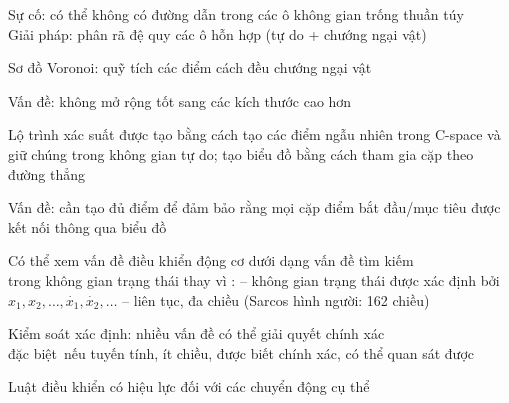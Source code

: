\documentclass{article}
\begin{document}
\begin{huge}

\qquad

\centerline{  \qquad {} }

Sự cố: có thể không có đường dẫn trong các ô không gian trống thuần túy\\
Giải pháp: phân rã đệ quy các ô hỗn hợp (tự do + chướng ngại vật)



Sơ đồ Voronoi: quỹ tích các điểm cách đều chướng ngại vật

\vspace*{0.2in}

\textwidth
{}

Vấn đề: không mở rộng tốt sang các kích thước cao hơn


Lộ trình xác suất được tạo bằng cách tạo các điểm ngẫu nhiên trong
C-space và giữ chúng trong không gian tự do; tạo biểu đồ bằng cách tham gia
cặp theo đường thẳng

\vspace*{0.2in}

\textwidth
{}

Vấn đề: cần tạo đủ điểm để đảm bảo rằng mọi
cặp điểm bắt đầu/mục tiêu được kết nối thông qua biểu đồ


Có thể xem vấn đề điều khiển động cơ dưới dạng vấn đề tìm kiếm\\
trong không gian trạng thái  thay vì :\al
-- không gian trạng thái được xác định bởi $x_1,x_2,\ldots,\dot{x_1},\dot{x_2},\ldots$\al
-- liên tục, đa chiều (Sarcos hình người: 162 chiều)

Kiểm soát xác định: nhiều vấn đề có thể giải quyết chính xác\\
đặc biệt~nếu tuyến tính, ít chiều, được biết chính xác, có thể quan sát được

Luật điều khiển  có hiệu lực đối với các chuyển động cụ thể


\end{huge}
\end{document}

